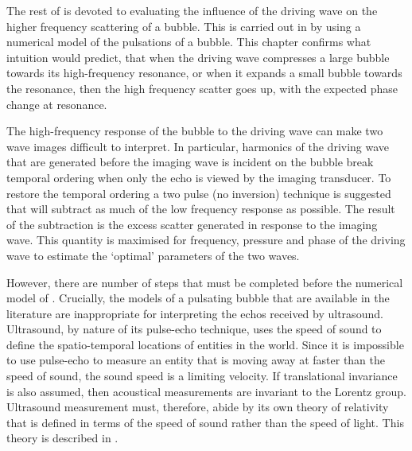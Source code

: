 



The rest of  is devoted to evaluating the influence
of the driving wave on the higher frequency scattering of a bubble.
This is carried out in 
by using a numerical model of the pulsations of a bubble.
This chapter confirms what intuition would predict, 
that when the driving wave compresses a large bubble towards its high-frequency resonance, 
or when it expands a small bubble towards the  resonance, then the high frequency scatter goes up,
with the expected phase change at resonance.

The high-frequency response of the bubble to the driving wave can make two wave images difficult to interpret.
In particular, harmonics of the driving wave that are generated before the imaging wave is incident on the bubble
break temporal ordering when only the echo is viewed by the imaging transducer.
To restore the temporal ordering a two pulse (no inversion) technique is suggested that will subtract as much of the low frequency response as possible.
The result of the subtraction is the excess scatter generated in response to the imaging wave.
This quantity is maximised for frequency, pressure and phase of the driving wave to estimate the `optimal' parameters of the two waves.


However, there are number of steps that must be completed before the numerical model of .
Crucially, the models of a pulsating bubble that are available in the literature
are inappropriate for interpreting the echos received by ultrasound.
Ultrasound, by nature of its pulse-echo technique,
uses the speed of sound to define the spatio-temporal locations of entities in the world.
Since it is impossible to use pulse-echo to measure an entity that is moving away at faster than the speed of sound,
the sound speed is a limiting velocity.
If translational invariance is also assumed,  then acoustical measurements are  invariant to the Lorentz group.
Ultrasound measurement must,
therefore, 
abide by its own theory of relativity that is
defined in terms of the speed of sound rather than the speed of light.
This theory is described in .

